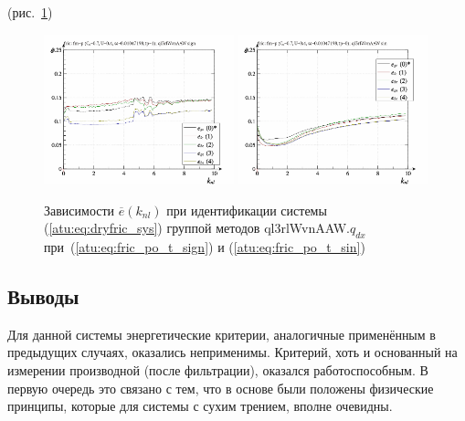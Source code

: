 (рис.~\ref{atu:f:fric_k_nl_ql3rlWvnAAW_q_dx})

\begin{figure}[htb!]
  \centerline{
    \includegraphics[width=0.49\textwidth]{p/cha/fric/ql3rlWvnAAW/fric_id-p_k_nl_sign.png}
    \hfill
    \includegraphics[width=0.49\textwidth]{p/cha/fric/ql3rlWvnAAW/fric_id-p_k_nl_sin.png}
  }
  \caption{Зависимости $\overline{e}(k_{nl})$ при идентификации системы (\ref{atu:eq:dryfric_sys}) группой методов ql3rlWvnAAW.$q_{dx}$
   при~(\ref{atu:eq:fric_po_t_sign}) и (\ref{atu:eq:fric_po_t_sin})}
  \label{atu:f:fric_k_nl_ql3rlWvnAAW_q_dx}
\end{figure}



\subsection{Выводы}  %

Для данной системы энергетические критерии, аналогичные применённым в предыдущих случаях,
оказались неприменимы. Критерий, хоть и основанный на измерении производной (после фильтрации),
оказался работоспособным. В первую очередь это связано с тем, что в основе были положены
физические принципы, которые для системы с сухим трением, вполне очевидны.





